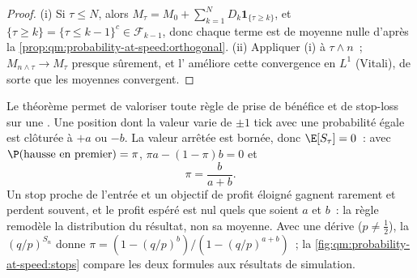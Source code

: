 \begin{proof}
(i) Si $\tau \le N$, alors $M_\tau = M_0 + \sum_{k=1}^N D_k\mathbf 1_{\{\tau \ge k\}}$, et
$\{\tau \ge k\} = \{\tau \le k-1\}^c \in \mathcal F_{k-1}$, donc chaque terme est de moyenne nulle d'après
la \cref{prop:qm:probability-at-speed:orthogonal}. (ii) Appliquer (i) à $\tau \wedge n$~; $M_{n \wedge
\tau} \to M_\tau$ presque sûrement, et l' améliore cette convergence en
$L^1$ (Vitali), de sorte que les moyennes convergent.
\end{proof}

Le théorème permet de valoriser toute règle de prise de bénéfice et de stop-loss sur une . Une position dont
la valeur varie de $\pm 1$ tick avec une probabilité égale est clôturée à $+a$ ou $-b$. La
valeur arrêtée est bornée, donc $\E[S_\tau] = 0$~: avec $\P(\text{hausse en premier}) = \pi$,
$\pi a - (1 - \pi)b = 0$ et
\[
\pi = \frac{b}{a+b}.
\]
Un stop proche de l'entrée et un objectif de profit éloigné gagnent rarement et perdent souvent, et le
profit espéré est nul quels que soient $a$ et $b$~: la règle remodèle la distribution du
résultat, non sa moyenne. Avec une dérive ($p \ne \tfrac12$), la  $(q/p)^{S_n}$ donne
$\pi = (1 - (q/p)^b)/(1 - (q/p)^{a+b})$~; la \cref{fig:qm:probability-at-speed:stops} compare
les deux formules aux résultats de simulation.

